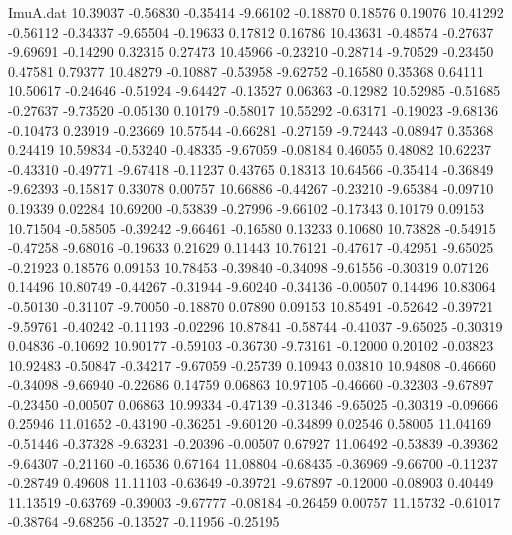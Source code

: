 \begin{filecontents}{ImuA.dat}
  10.39037   -0.56830   -0.35414   -9.66102   -0.18870    0.18576    0.19076
  10.41292   -0.56112   -0.34337   -9.65504   -0.19633    0.17812    0.16786
  10.43631   -0.48574   -0.27637   -9.69691   -0.14290    0.32315    0.27473
  10.45966   -0.23210   -0.28714   -9.70529   -0.23450    0.47581    0.79377
  10.48279   -0.10887   -0.53958   -9.62752   -0.16580    0.35368    0.64111
  10.50617   -0.24646   -0.51924   -9.64427   -0.13527    0.06363   -0.12982
  10.52985   -0.51685   -0.27637   -9.73520   -0.05130    0.10179   -0.58017
  10.55292   -0.63171   -0.19023   -9.68136   -0.10473    0.23919   -0.23669
  10.57544   -0.66281   -0.27159   -9.72443   -0.08947    0.35368    0.24419
  10.59834   -0.53240   -0.48335   -9.67059   -0.08184    0.46055    0.48082
  10.62237   -0.43310   -0.49771   -9.67418   -0.11237    0.43765    0.18313
  10.64566   -0.35414   -0.36849   -9.62393   -0.15817    0.33078    0.00757
  10.66886   -0.44267   -0.23210   -9.65384   -0.09710    0.19339    0.02284
  10.69200   -0.53839   -0.27996   -9.66102   -0.17343    0.10179    0.09153
  10.71504   -0.58505   -0.39242   -9.66461   -0.16580    0.13233    0.10680
  10.73828   -0.54915   -0.47258   -9.68016   -0.19633    0.21629    0.11443
  10.76121   -0.47617   -0.42951   -9.65025   -0.21923    0.18576    0.09153
  10.78453   -0.39840   -0.34098   -9.61556   -0.30319    0.07126    0.14496
  10.80749   -0.44267   -0.31944   -9.60240   -0.34136   -0.00507    0.14496
  10.83064   -0.50130   -0.31107   -9.70050   -0.18870    0.07890    0.09153
  10.85491   -0.52642   -0.39721   -9.59761   -0.40242   -0.11193   -0.02296
  10.87841   -0.58744   -0.41037   -9.65025   -0.30319    0.04836   -0.10692
  10.90177   -0.59103   -0.36730   -9.73161   -0.12000    0.20102   -0.03823
  10.92483   -0.50847   -0.34217   -9.67059   -0.25739    0.10943    0.03810
  10.94808   -0.46660   -0.34098   -9.66940   -0.22686    0.14759    0.06863
  10.97105   -0.46660   -0.32303   -9.67897   -0.23450   -0.00507    0.06863
  10.99334   -0.47139   -0.31346   -9.65025   -0.30319   -0.09666    0.25946
  11.01652   -0.43190   -0.36251   -9.60120   -0.34899    0.02546    0.58005
  11.04169   -0.51446   -0.37328   -9.63231   -0.20396   -0.00507    0.67927
  11.06492   -0.53839   -0.39362   -9.64307   -0.21160   -0.16536    0.67164
  11.08804   -0.68435   -0.36969   -9.66700   -0.11237   -0.28749    0.49608
  11.11103   -0.63649   -0.39721   -9.67897   -0.12000   -0.08903    0.40449
  11.13519   -0.63769   -0.39003   -9.67777   -0.08184   -0.26459    0.00757
  11.15732   -0.61017   -0.38764   -9.68256   -0.13527   -0.11956   -0.25195

\end{filecontents}

